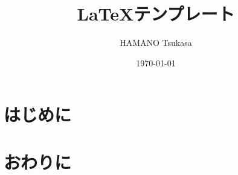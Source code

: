 \documentclass[a4paper,onecolumn,12pt,uplatex]{jsarticle}
\title{\LaTeX テンプレート}
\author{HAMANO Tsukasa}
\date{\today}
\begin{document}
\maketitle
\vspace{1em}
\tableofcontents
\clearpage

\section{はじめに}
\lipsum[1]

\section{おわりに}
\lipsum[2]
\end{document}
